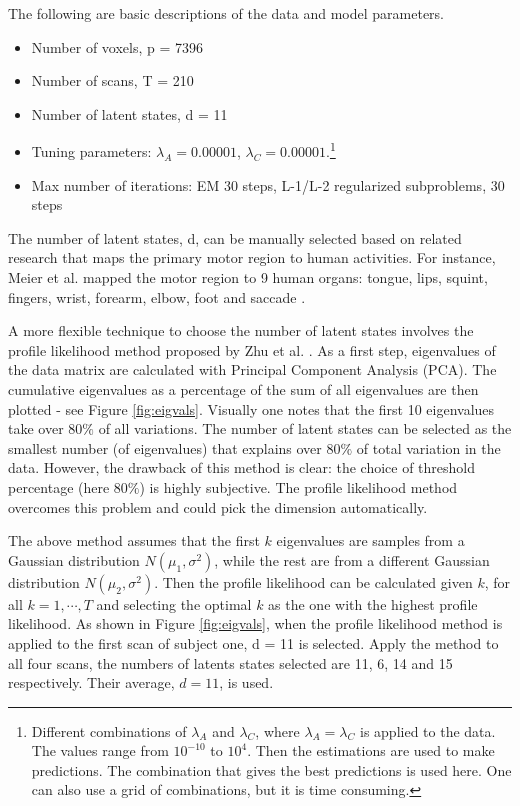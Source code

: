 \documentclass[fleqn]{article}
\let\oldref\ref
\renewcommand{\ref}[1]{(\oldref{#1})}
\begin{document}
The following are basic descriptions of the data and model parameters.
\begin{itemize}[noitemsep, topsep=0pt]
\item Number of voxels, p = 7396
\item Number of scans, T = 210
\item Number of latent states, d = 11
\item Tuning parameters: $\lambda_A = 0.00001$, $\lambda_C = 0.00001$.\footnote{Different combinations of $\lambda_A$ and $\lambda_C$, where $\lambda_A = \lambda_C$ is applied to the data. The values range from $10^{-10}$ to $10^{4}$. Then the estimations are used to make predictions. The combination that gives the best predictions is used here. One can also use a grid of combinations, but it is time consuming.}
\item Max number of iterations: EM 30 steps, L-1/L-2 regularized subproblems, 30 steps
\end{itemize}

The number of latent states, d, can be manually selected based on related research that maps the primary motor region to human activities. For instance, Meier et al. mapped the motor region to 9 human organs: tongue, lips, squint, fingers, wrist, forearm, elbow, foot and saccade \cite{meier2008complex}.

A more flexible technique to choose the number of latent states involves the profile likelihood method proposed by Zhu et al. \cite{zhu2006automatic}. As a first step, eigenvalues of the data matrix are calculated with Principal Component Analysis (PCA). The cumulative eigenvalues as a percentage of the sum of all eigenvalues are then plotted - see Figure \oldref{fig:eigvals}. Visually one notes that the first 10 eigenvalues take over $80\%$ of all variations. The number of latent states can be selected as the smallest number (of eigenvalues) that explains over $80\%$ of total variation in the data. However, the drawback of this method is clear: the choice of threshold percentage (here $80\%$) is highly subjective. The profile likelihood method overcomes this problem and could pick the dimension automatically.

The above method assumes that the first $k$ eigenvalues are samples from a Gaussian distribution $N(\mu_1,\sigma^2)$, while the rest are from a different Gaussian distribution $N(\mu_2,\sigma^2)$. Then the profile likelihood can be calculated given $k$, for all $k=1,\cdots,T$ and selecting the optimal $k$ as the one with the highest profile likelihood. As shown in Figure \oldref{fig:eigvals}, when the profile likelihood method is applied to the first scan of subject one, d = 11 is selected. Apply the method to all four scans, the numbers of latents states selected are 11, 6, 14 and 15 respectively. Their average, $d=11$, is used.
\end{document}
